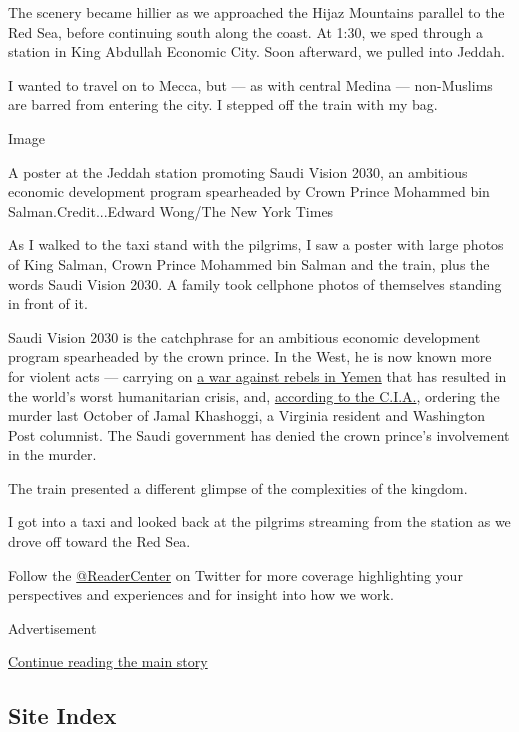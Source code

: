 The scenery became hillier as we approached the Hijaz Mountains parallel
to the Red Sea, before continuing south along the coast. At 1:30, we
sped through a station in King Abdullah Economic City. Soon afterward,
we pulled into Jeddah.

I wanted to travel on to Mecca, but --- as with central Medina ---
non-Muslims are barred from entering the city. I stepped off the train
with my bag.

Image

A poster at the Jeddah station promoting Saudi Vision 2030, an ambitious
economic development program spearheaded by Crown Prince Mohammed bin
Salman.Credit...Edward Wong/The New York Times

As I walked to the taxi stand with the pilgrims, I saw a poster with
large photos of King Salman, Crown Prince Mohammed bin Salman and the
train, plus the words Saudi Vision 2030. A family took cellphone photos
of themselves standing in front of it.

Saudi Vision 2030 is the catchphrase for an ambitious economic
development program spearheaded by the crown prince. In the West, he is
now known more for violent acts --- carrying on
\href{https://www.nytimes.com/interactive/2018/10/31/magazine/yemen-war-saudi-arabia.html}{a
war against rebels in Yemen} that has resulted in the world's worst
humanitarian crisis, and,
\href{https://www.nytimes.com/2018/11/16/us/politics/cia-saudi-crown-prince-khashoggi.html}{according
to the C.I.A.}, ordering the murder last October of Jamal Khashoggi, a
Virginia resident and Washington Post columnist. The Saudi government
has denied the crown prince's involvement in the murder.

The train presented a different glimpse of the complexities of the
kingdom.

I got into a taxi and looked back at the pilgrims streaming from the
station as we drove off toward the Red Sea.

Follow the \href{https://twitter.com/readercenter}{@ReaderCenter} on
Twitter for more coverage highlighting your perspectives and experiences
and for insight into how we work.

Advertisement

\protect\hyperlink{after-bottom}{Continue reading the main story}

\hypertarget{site-index}{%
\subsection{Site Index}\label{site-index}}

